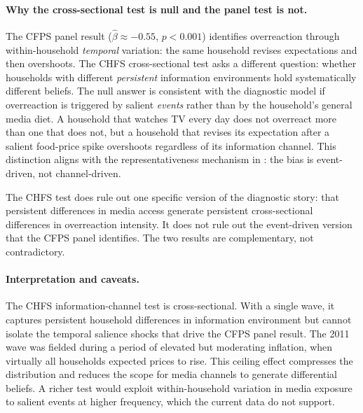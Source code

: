 \paragraph{Why the cross-sectional test is null and the panel test is not.}
The CFPS panel result ($\hat{\beta} \approx -0.55$, $p < 0.001$)
identifies overreaction through within-household \textit{temporal}
variation: the same household revises expectations and then
overshoots. The CHFS cross-sectional test asks a different question:
whether households with different \textit{persistent} information
environments hold systematically different beliefs. The null answer
is consistent with the diagnostic model if overreaction is triggered
by salient \textit{events} rather than by the household's general
media diet. A household that watches TV every day does not overreact
more than one that does not, but a household that revises its
expectation after a salient food-price spike overshoots regardless of
its information channel. This distinction aligns with the
representativeness mechanism in \citet{Bordalo2018}: the bias is
event-driven, not channel-driven.

The CHFS test does rule out one specific version of the diagnostic
story: that persistent differences in media access generate
persistent cross-sectional differences in overreaction intensity.
It does not rule out the event-driven version that the CFPS panel
identifies. The two results are complementary, not contradictory.



\paragraph{Interpretation and caveats.}
The CHFS information-channel test is cross-sectional. With a single
wave, it captures persistent household differences in information
environment but cannot isolate the temporal salience shocks that drive
the CFPS panel result. The 2011 wave was fielded during a period of
elevated but moderating inflation, when virtually all households
expected prices to rise. This ceiling effect compresses the
distribution and reduces the scope for media channels to generate
differential beliefs. A richer test would exploit within-household
variation in media exposure to salient events at higher frequency,
which the current data do not support.




